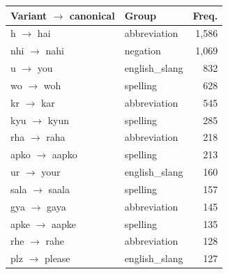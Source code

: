 \begin{tabular}{llr}
\toprule
Variant $\rightarrow$ canonical & Group & Freq.\\
\midrule
h $\rightarrow$ hai & abbreviation & 1,586\\
nhi $\rightarrow$ nahi & negation & 1,069\\
u $\rightarrow$ you & english\_slang & 832\\
wo $\rightarrow$ woh & spelling & 628\\
kr $\rightarrow$ kar & abbreviation & 545\\
kyu $\rightarrow$ kyun & spelling & 285\\
rha $\rightarrow$ raha & abbreviation & 218\\
apko $\rightarrow$ aapko & spelling & 213\\
ur $\rightarrow$ your & english\_slang & 160\\
sala $\rightarrow$ saala & spelling & 157\\
gya $\rightarrow$ gaya & abbreviation & 145\\
apke $\rightarrow$ aapke & spelling & 135\\
rhe $\rightarrow$ rahe & abbreviation & 128\\
plz $\rightarrow$ please & english\_slang & 127\\
\bottomrule
\end{tabular}
